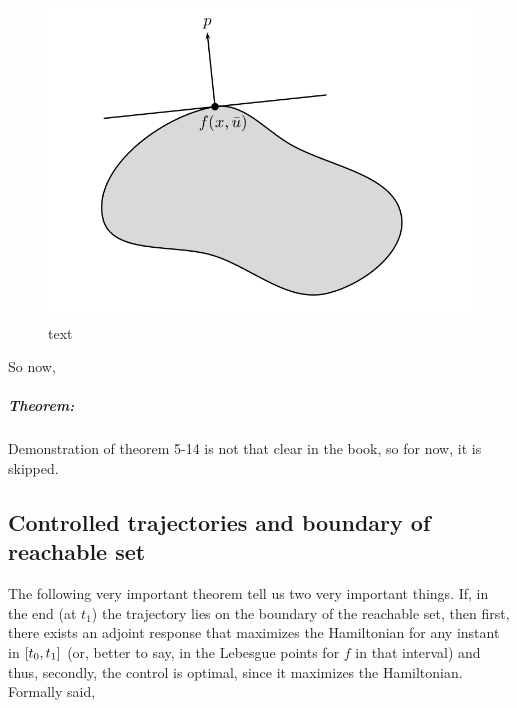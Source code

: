 \begin{figure}[h!]
	\includegraphics[width=\linewidth]{imgs/512-514.png}
	\caption{text}
	\label{fig-5.2}
\end{figure}

So now, 
\subparagraph[5.14]{Theorem:} Demonstration of theorem 5-14 is not that clear in the book, so for now, it is skipped.


\subsection{Controlled trajectories and boundary of reachable set}
The following very important theorem tell us two very important things. If, in the end (at $t_1$) the trajectory lies on the boundary of the reachable set, then first, there exists an adjoint response that maximizes the Hamiltonian for any instant in $[t_0,t_1]$ (or, better to say, in the Lebesgue points for $f$ in that interval) and thus, secondly, the control is optimal, since it maximizes the Hamiltonian. \\
Formally said,

